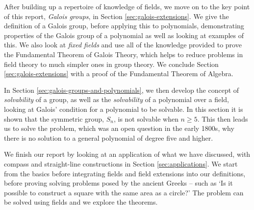 After building up a repertoire of knowledge of fields, we move on to the key point of this report, \textit{Galois groups}, in Section \ref{sec:galois-extensions}. We give the definition of a Galois group, before applying this to polynomials, demonstrating properties of the Galois group of a polynomial as well as looking at examples of this. We also look at \textit{fixed fields} and use all of the knowledge provided to prove the Fundamental Theorem of Galois Theory, which helps to reduce problems in field theory to much simpler ones in group theory. We conclude Section \ref{sec:galois-extensions} with a proof of the Fundamental Theorem of Algebra.

In Section \ref{sec:galois-groups-and-polynomials}, we then develop the concept of \textit{solvability} of a group, as well as the \textit{solvability} of a polynomial over a field, looking at Galois’ condition for a polynomial to be solvable. In this section it is shown that the symmetric group, $S_n$, is not solvable when $n \geq 5$. This then leads us to solve the problem, which was an open question in the early 1800s, why there is no solution to a general polynomial of degree five and higher.

We finish our report by looking at an application of what we have discussed, with compass and straight-line constructions in Section \ref{sec:applications}. We start from the basics before integrating fields and field extensions into our definitions, before proving solving problems posed by the ancient Greeks – such as ‘Is it possible to construct a square with the same area as a circle?’ The problem can be solved using fields and we explore the theorems.
